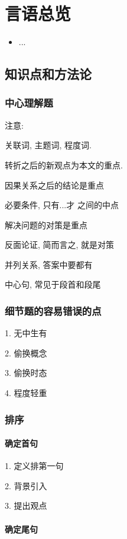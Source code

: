 \chapter{言语总览}
\label{chap1}
\begin{itemize}[noitemsep,topsep=0pt,parsep=0pt,partopsep=0pt]
	\item ...
\end{itemize}

\section{知识点和方法论}


\subsection{中心理解题}

注意:

关联词, 主题词, 程度词.

转折之后的新观点为本文的重点.

因果关系之后的结论是重点

必要条件, 只有...才 之间的中点

解决问题的对策是重点

反面论证, 简而言之, 就是对策

并列关系, 答案中要都有

中心句, 常见于段首和段尾


\subsection{细节题的容易错误的点}
1. 无中生有

2. 偷换概念

3. 偷换时态

4. 程度轻重

\subsection{排序}

\subsubsection{确定首句}
1. 定义排第一句

2. 背景引入

3. 提出观点

\subsubsection{确定尾句}

